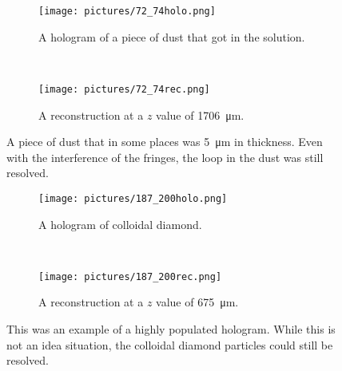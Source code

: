 \begin{figure}[ht!]
    \begin{center}

        \begin{subfigure}[t]{0.4\textwidth}
            \label{fig:72_74holo}
            \texttt{[image: pictures/72\_74holo.png]}
            \caption{A hologram of a piece of dust that got in the solution.}
        \end{subfigure}
        \\
        \begin{subfigure}[t]{\textwidth}
            \label{fig:72_74rec}
            \texttt{[image: pictures/72\_74rec.png]}
            \caption{A reconstruction at a $z$ value of
                \SI{1706}{\micro\meter}.}
        \end{subfigure}


    \end{center}
    \caption{%
        A piece of dust that in some places was \SI{5}{\micro\meter} in
        thickness. Even with the interference of the fringes, the loop in the
        dust was still resolved.
    }%
    \label{fig:72_74}
\end{figure}


\clearpage


\begin{figure}[ht!]
    \begin{center}

        \begin{subfigure}[t]{0.4\textwidth}
            \label{fig:187_200holo}
            \texttt{[image: pictures/187\_200holo.png]}
            \caption{A hologram of colloidal diamond.}
        \end{subfigure}
        \\
        \begin{subfigure}[t]{\textwidth}
            \label{fig:187_200rec}
            \texttt{[image: pictures/187\_200rec.png]}
            \caption{A reconstruction at a $z$ value of \SI{675}{\micro\meter}.}
        \end{subfigure}


    \end{center}
    \caption{%
        This was an example of a highly populated hologram. While this is not
        an idea situation, the colloidal diamond particles could still be
        resolved.
    }%
    \label{fig:187_200}
\end{figure}

